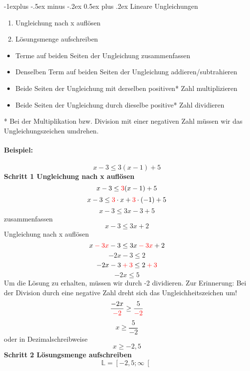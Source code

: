 \documentclass[10pt,landscape]{article}
\makeatletter
\renewcommand{\subsection}{\@startsection{subsection}{2}{0mm}%
                                {-1explus -.5ex minus -.2ex}%
                                {0.5ex plus .2ex}%
                                {\normalfont\normalsize\bfseries}}
\makeatother
\begin{document}
\begin{multicols}{3}
    \subsection{Lineare Ungleichungen}
    \begin{enumerate}
        \item Ungleichung nach x auflösen
        \item Lösungsmenge aufschreiben
    \end{enumerate}
    \begin{itemize}
        \item Terme auf beiden Seiten der Ungleichung zusammenfassen
        \item Denselben Term auf beiden Seiten der Ungleichung addieren/subtrahieren
        \item Beide Seiten der Ungleichung mit derselben positiven* Zahl multiplizieren
        \item Beide Seiten der Ungleichung durch dieselbe positive* Zahl dividieren
    \end{itemize}
    * Bei der Multiplikation bzw. Division mit einer negativen Zahl müssen wir das Ungleichungszeichen umdrehen.\\~\\
    \textbf{Beispiel:}\\~\\
    \[x - 3 \leq 3 (x-1) + 5\]
    \textbf{Schritt 1 Ungleichung nach x auflösen}\\
    \[x - 3 \leq {\color{red}3} (x-1) + 5\]
    \[x - 3 \leq {\color{red}3} \cdot x + {\color{red}3} \cdot (-1) + 5\]
    \[x - 3 \leq 3x - 3 + 5\]
    zusammenfassen
    \[x - 3 \leq 3x + 2\]
    Ungleichung nach x auflösen
    \[x {\color{red}\:-\:3x} - 3 \leq 3x {\color{red}\:-\:3x} + 2\]
    \[-2x - 3 \leq 2\]
    \[-2x - 3 {\color{red}\:+\:3} \leq 2 {\color{red}\:+\:3}\]
    \[-2x \leq 5\]
    Um die Lösung zu erhalten, müssen wir durch -2 dividieren.
    Zur Erinnerung: Bei der Division durch eine negative Zahl dreht sich das Ungleichheitszeichen um!
    \[\frac{-2x}{{\color{red}-2}} \geq \frac{5}{{\color{red}-2}}\]
    \[x \geq \frac{5}{-2}\]
    oder in Dezimalschreibweise
    \[x \geq -2{,}5\]
    \textbf{Schritt 2 Lösungsmenge aufschreiben}\\
    \[\mathbb{L} = \left[-2{,}5;\infty\right[\]

\end{multicols}
\end{document}
